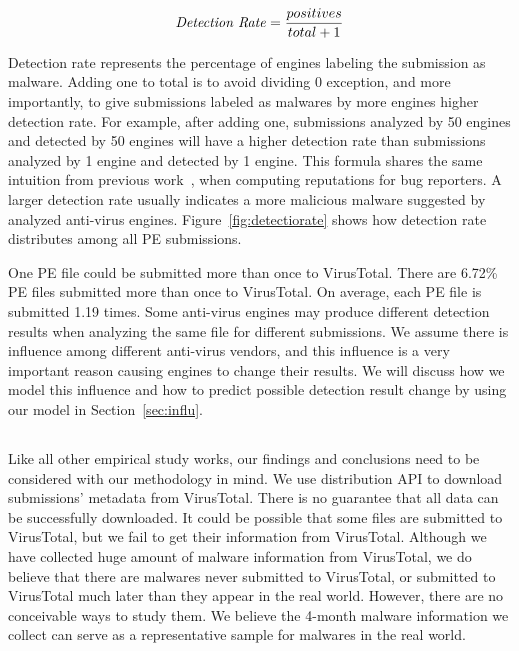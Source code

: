 $$ \textrm{\textit{Detection Rate}} = \dfrac{positives}{total + 1}$$

Detection rate represents the percentage of engines labeling the submission as malware. 
Adding one to total is to avoid dividing 0 exception, and more importantly, 
to give submissions labeled as malwares by more engines higher detection rate. 
For example, after adding one, submissions analyzed by 50 engines and detected by 50 engines will have a higher detection rate 
than submissions analyzed by 1 engine and detected by 1 engine. 
This formula shares the same intuition from previous work~\cite{GuoICSE2010}, when computing reputations for bug reporters. 
A larger detection rate usually indicates a more malicious malware suggested by analyzed anti-virus engines. 
Figure~\ref{fig:detectiorate} shows how detection rate distributes among all PE submissions. 

One PE file could be submitted more than once to VirusTotal. 
There are 6.72\% PE files submitted more than once to VirusTotal. 
On average, each PE file is submitted 1.19 times. 
Some anti-virus engines may produce different detection results when analyzing the same file for different submissions.
We assume there is influence among different anti-virus vendors, 
and this influence is a very important reason causing engines to change their results.
We will discuss how we model this influence and how to predict possible detection result change by using our model in Section~\ref{sec:influ}.

\subsection{}

Like all other empirical study works, 
our findings and conclusions need to be considered with our methodology in mind. 
We use distribution API to download submissions' metadata from VirusTotal. 
There is no guarantee that all data can be successfully downloaded. 
It could be possible that some files are submitted to VirusTotal, 
but we fail to get their information from VirusTotal.
Although we have collected huge amount of malware information from VirusTotal,
we do believe that there are malwares never submitted to VirusTotal, 
or submitted to VirusTotal much later than they appear in the real world. 
However, there are no conceivable ways to study them.
We believe the 4-month malware information we collect can serve as a representative sample for malwares in the real world. 
